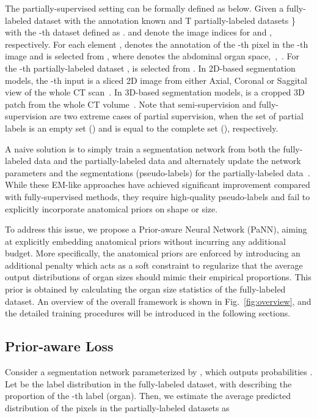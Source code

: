 \documentclass[10pt,twocolumn,letterpaper]{article}
\begin{document}
The partially-supervised setting can be formally defined as below. Given a fully-labeled dataset  with the annotation  known and T partially-labeled datasets \} with the -th dataset defined as .  and  denote the image indices for  and  , respectively.
For each element ,  denotes the annotation of the -th pixel in the -th image  and is selected from , where  denotes the abdominal organ space,~\ie,~. For the -th partially-labeled dataset ,  is selected from . In 2D-based segmentation models, the -th input  is a sliced 2D image from either Axial, Coronal or Saggital view of the whole CT scan~\cite{zhou2017fixed,roth2018spatial,zhou2019semi,wang2018training}. In 3D-based segmentation models,  is a cropped 3D patch from the whole CT volume~\cite{cciccek20163d, milletari2016v}. 
Note that semi-supervision and fully-supervision are two extreme cases of partial supervision, when the set of partial labels is an empty set () and is equal to the complete set (), respectively.

A naive solution is to simply train a segmentation network from both the fully-labeled data and the partially-labeled data and alternately update the network parameters and the segmentations (pseudo-labels) for the partially-labeled data~\cite{zhou2019semi,bai2017semi}. While these EM-like approaches have achieved significant improvement compared with fully-supervised methods, they require high-quality pseudo-labels and fail to explicitly incorporate anatomical priors on shape or size.

To address this issue, we propose a Prior-aware Neural Network (PaNN), aiming at explicitly embedding anatomical priors without incurring any additional budget. More specifically, the anatomical priors are enforced by introducing an additional penalty which acts as a soft constraint to regularize that the average output distributions of organ sizes should mimic their empirical proportions. This prior is obtained by calculating the organ size statistics of the fully-labeled dataset. An overview of the overall framework is shown in Fig.~\ref{fig:overview}, and the detailed training procedures will be introduced in the following sections.


\subsection{Prior-aware Loss}

Consider a segmentation network parameterized by , which outputs probabilities .
Let  be the label distribution in the fully-labeled dataset, with  describing the proportion of the -th label (organ). Then, we estimate the average predicted distribution of the pixels in the partially-labeled datasets as
\end{document}
